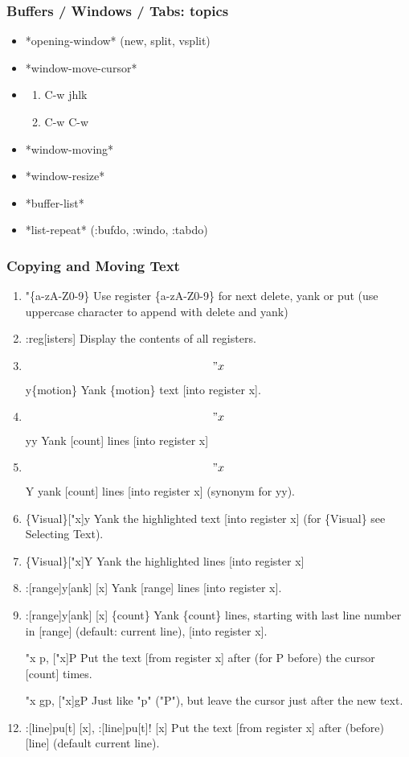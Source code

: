 \documentclass{beamer}
\begin{document}
\begin{frame}
  \frametitle{Buffers / Windows / Tabs: topics}
  \begin{itemize} 
    \item *opening-window* (new, split, vsplit) \\
    \item *window-move-cursor* \\
    \item
      \begin{enumerate}
        \item C-w jhlk
        \item C-w C-w
      \end{enumerate}
    \item *window-moving* \\
    \item *window-resize* \\
    \item *buffer-list* \\
    \item *list-repeat* (:bufdo, :windo, :tabdo)
  \end{itemize}
\end{frame}

\begin{frame}
  \frametitle{Copying and Moving Text}

  \begin{enumerate}
    \item "\{a-zA-Z0-9\}    Use register \{a-zA-Z0-9\} for next delete, yank or put (use uppercase character to append with delete and yank)
    \item :reg[isters]  Display the contents of all registers.
    \item \["x\]y\{motion\}   Yank \{motion\} text [into register x].
    \item \["x\]yy    Yank [count] lines [into register x]
    \item \["x\]Y     yank [count] lines [into register x] (synonym for yy).
    \item \{Visual\}["x]y   Yank the highlighted text [into register x] (for \{Visual\} see Selecting Text).
    \item \{Visual\}["x]Y   Yank the highlighted lines [into register x]
    \item :[range]y[ank] [x]    Yank [range] lines [into register x].
    \item :[range]y[ank] [x] \{count\}  Yank \{count\} lines, starting with last line number in [range] (default: current line), [into register x].
    \item ["x]p, ["x]P      Put the text [from register x] after (for P before) the cursor [count] times.
    \item ["x]gp, ["x]gP    Just like "p" ("P"), but leave the cursor just after the new text.
    \item :[line]pu[t] [x], :[line]pu[t]! [x]   Put the text [from register x] after (before) [line] (default current line).
  \end{enumerate}
\end{frame}
\end{document}
